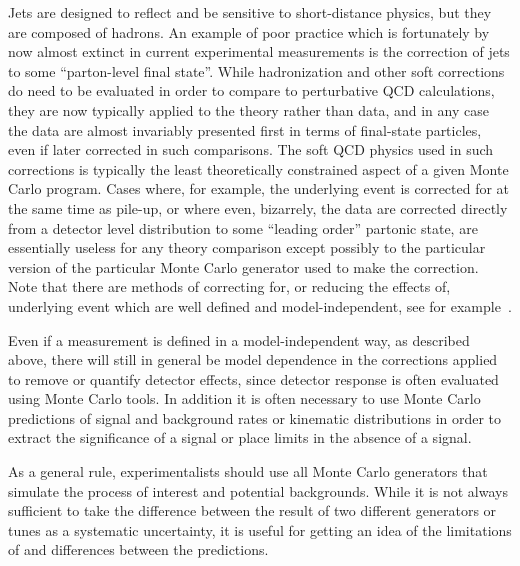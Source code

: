 Jets are designed to reflect and be sensitive to short-distance physics,
but they are composed of hadrons.  An example of poor practice which is
fortunately by now almost extinct in current experimental measurements
is the correction of jets to some ``parton-level final state''. While
hadronization and other soft corrections do need to be evaluated in
order to compare to perturbative QCD calculations, they are now
typically applied to the theory rather than data, and in any case the
data are almost invariably presented first in terms of final-state
particles, even if later corrected in such comparisons. The soft QCD
physics used in such corrections is typically the least theoretically
constrained aspect of a given Monte Carlo program. Cases where, for example, the
underlying event is corrected for at the same time as pile-up, or where
even, bizarrely, the data are corrected directly from a detector level
distribution to some ``leading order'' partonic state, are essentially
useless for any theory comparison except possibly to the particular
version of the particular Monte Carlo generator used to make the correction. Note that there are
methods of correcting for, or reducing the effects of, underlying event which
are well defined and model-independent, see for example~\cite{Cacciari:2009dp}.




Even if a measurement is defined in a model-independent way, as
described above, there will still in general be model dependence in the
corrections applied to remove or quantify detector effects, since
detector response is often evaluated using Monte Carlo tools.  In addition it is
often necessary to use Monte Carlo predictions of signal and background rates
or kinematic distributions in order to extract the significance of a
signal or place limits in the absence of a signal.

As a general rule, experimentalists should use all Monte Carlo generators that
simulate the process of interest and potential backgrounds. While it is
not always sufficient to take the difference between the result of two
different generators or tunes as a systematic uncertainty, it is useful
for getting an idea of the limitations of and differences between the
predictions.

